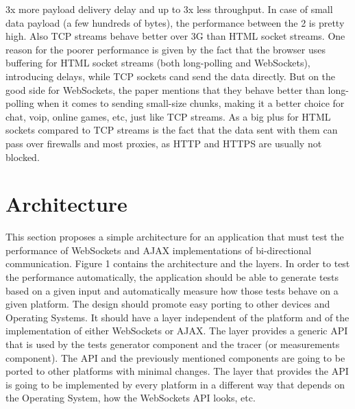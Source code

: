 \documentclass[conference]{IEEEtran}
\begin{document}
3x more payload delivery delay and up to 3x less throughput. In case of small
data payload (a few hundreds of bytes), the performance between the 2 is
pretty high. Also TCP streams behave better over 3G than HTML socket streams.
One reason for the poorer performance is given by the fact that the browser uses
buffering for HTML socket streams (both long-polling and WebSockets), introducing
delays, while TCP sockets cand send the data directly. But on the good side for
WebSockets, the paper mentions that they behave better than long-polling when
it comes to sending small-size chunks, making it a better choice for chat,
voip, online games, etc, just like TCP streams. As a big plus for HTML sockets
compared to TCP streams is the fact that the data sent with them can pass over
firewalls and most proxies, as HTTP and HTTPS are usually not blocked.

\section{Architecture}
This section proposes a simple architecture for an application that must test
the performance of WebSockets and AJAX implementations of bi-directional
communication. Figure 1 contains the architecture and the layers. In order to
test the performance automatically, the application should be able to generate
tests based on a given input and automatically measure how those tests behave
on a given platform. The design should promote easy porting to other devices
and Operating Systems. It should have a layer independent of the platform and
of the implementation of either WebSockets or AJAX. The layer provides a generic
API that is used by the tests generator component and the tracer (or measurements
component). The API and the previously mentioned components are going to be ported
to other platforms with minimal changes. The layer that provides the API is going
to be implemented by every platform in a different way that depends on the
Operating System, how the WebSockets API looks, etc.

{}

\end{document}
